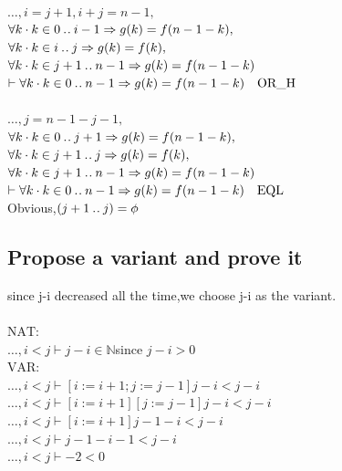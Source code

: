 \documentclass[11pt,a4paper,fleqn]{article}
\begin{document}
\\
$ \ldots,i=j+1,i+j=n-1,$\\
$ \forall k\cdot k\in 0\mathbin{.\mkern1mu.} i-1 \Rightarrow g(k)=f(n-1-k),$\\
$ \forall k\cdot k\in i\mathbin{.\mkern1mu.} j \Rightarrow g(k)=f(k),$\\
$ \forall k\cdot k\in j+1\mathbin{.\mkern1mu.} n-1 \Rightarrow g(k)=f(n-1-k)$\\
$\vdash \forall k\cdot k\in 0\mathbin{.\mkern1mu.} n-1 \Rightarrow g(k)=f(n-1-k)\quad\text{OR\_H}$\\
\\
$ \ldots,j=n-1-j-1,$\\
$ \forall k\cdot k\in 0\mathbin{.\mkern1mu.} j+1 \Rightarrow g(k)=f(n-1-k),$\\
$ \forall k\cdot k\in j+1\mathbin{.\mkern1mu.} j \Rightarrow g(k)=f(k),$\\
$ \forall k\cdot k\in j+1\mathbin{.\mkern1mu.} n-1 \Rightarrow g(k)=f(n-1-k)$\\
$\vdash \forall k\cdot k\in 0\mathbin{.\mkern1mu.} n-1 \Rightarrow g(k)=f(n-1-k)\quad\text{EQL}$\\
Obvious,$(j+1\mathbin{.\mkern1mu.} j)=\mathbb{\phi}$\\


\subsection{Propose a variant and prove it}
\noindent
since j-i decreased all the time,we choose j-i as the variant.\\
\\
$\text{NAT:}$\\
$\ldots,i<j\vdash j-i\in \mathbb{N}$\quad since $j-i>0$\\
$\text{VAR:}$\\
$ \ldots,i<j\vdash [i:=i+1;j:=j-1]j-i<j-i$\\
$ \ldots,i<j\vdash [i:=i+1][j:=j-1]j-i<j-i$\\
$ \ldots,i<j\vdash [i:=i+1]j-1-i<j-i$\\
$ \ldots,i<j\vdash j-1-i-1<j-i$\\
$ \ldots,i<j\vdash -2<0$
\end{document}
